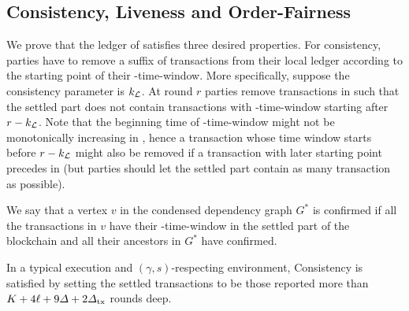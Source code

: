 \subsection{Consistency, Liveness and Order-Fairness}

We prove that the ledger \ledger of \Taxis satisfies three desired properties.
%
For consistency, parties have to remove a suffix of transactions from their local ledger \ledger according to the starting point of their \PBWindowLen-time-window.
%
More specifically, suppose the consistency parameter is $k_\mathcal{L}$.
%
At round $r$ parties remove transactions in \ledger such that the settled part does not contain transactions with \PBWindowLen-time-window starting after $r - k_\mathcal{L}$.
%
Note that the beginning time of \PBWindowLen-time-window might not be monotonically increasing in \ledger, hence a transaction \tx whose time window starts before $r - k_\mathcal{L}$ might also be removed if a transaction with later starting point precedes \tx in \ledger (but parties should let the settled part contain as many transaction as possible).

We say that a vertex $v$ in the condensed dependency graph $G^*$ is confirmed if all the transactions in $v$ have their \PBWindowLen-time-window in the settled part of the \Taxis blockchain and all their ancestors in $G^*$ have confirmed.

\begin{theorem}[Consistency] \label{thm:consistency}
    In a typical execution and $(\gamma, s)$-respecting environment, Consistency is satisfied by setting the settled transactions to be those reported more than $K + 4\ell + 9\varDelta + 2\varDelta_{\mathrm{tx}}$ rounds deep.
\end{theorem}

